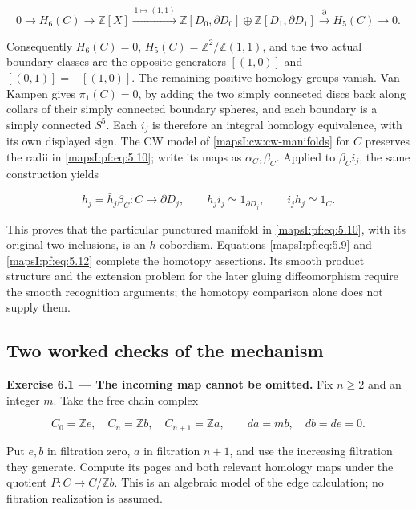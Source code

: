 \begin{equation}
0\longrightarrow H_6(C)\longrightarrow
\mathbb Z[X]\xrightarrow{\,1\mapsto(1,1)\,}
\mathbb Z[D_0,\partial D_0]\oplus\mathbb Z[D_1,\partial D_1]
\xrightarrow{\partial}H_5(C)\longrightarrow0.
\label{mapsI:pf:eq:5.11}
\end{equation}

Consequently \(H_6(C)=0\), \(H_5(C)=\mathbb Z^2/\mathbb Z(1,1)\), and the two actual boundary classes are the opposite generators \([(1,0)]\) and \([(0,1)]=-[(1,0)]\). The remaining positive homology groups vanish. Van Kampen gives \(\pi_1(C)=0\), by adding the two simply connected discs back along collars of their simply connected boundary spheres, and each boundary is a simply connected \(S^5\). Each \(i_j\) is therefore an integral homology equivalence, with its own displayed sign. The CW model of \cref{mapsI:cw:cw-manifolds} for \(C\) preserves the radii in \eqref{mapsI:pf:eq:5.10}; write its maps as \(\alpha_C,\beta_C\). Applied to \(\beta_Ci_j\), the same construction yields

\begin{equation}
h_j=\bar h_j\beta_C:C\to\partial D_j,\qquad
h_ji_j\simeq1_{\partial D_j},\qquad i_jh_j\simeq1_C.
\label{mapsI:pf:eq:5.12}
\end{equation}

This proves that the particular punctured manifold in \eqref{mapsI:pf:eq:5.10}, with its original two inclusions, is an \(h\)-cobordism. Equations \eqref{mapsI:pf:eq:5.9} and \eqref{mapsI:pf:eq:5.12} complete the homotopy assertions. Its smooth product structure and the extension problem for the later gluing diffeomorphism require the smooth recognition arguments; the homotopy comparison alone does not supply them.

\subsection{Two worked checks of the mechanism}
\label{mapsI:pf:path-fibre-exercises}

\textbf{Exercise 6.1 --- The incoming map cannot be omitted.}\label{mapsI:pf:exercise:6.1} Fix \(n\geq2\) and an integer \(m\). Take the free chain complex

\begin{equation}
C_0=\mathbb Ze,\quad C_n=\mathbb Zb,\quad C_{n+1}=\mathbb Za,
\qquad da=mb,\quad db=de=0.
\label{mapsI:pf:eq:6.1}
\end{equation}

Put \(e,b\) in filtration zero, \(a\) in filtration \(n+1\), and use the increasing filtration they generate. Compute its pages and both relevant homology maps under the quotient \(P:C\to C/\mathbb Zb\). This is an algebraic model of the edge calculation; no fibration realization is assumed.

